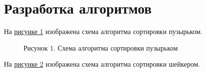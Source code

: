 \documentclass[12pt]{report}
\begin{document}
	\section{Разработка алгоритмов}
	На \hyperref[Schema1]{рисунке 1} изображена схема алгоритма сортировки пузырьком.
	\begin{figure}[h!]\label{Schema1}
		\caption*{Рисунок 1. Схема алгоритма сортировки пузырьком}
	\end{figure}
	\newpage
	На \hyperref[Schema2]{рисунке 2} изображена схема алгоритма сортировки шейкером.
\end{document}
